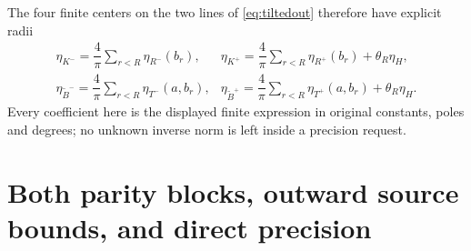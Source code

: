 \documentclass[11pt]{article}
\begin{document}
The four finite centers on the two lines of \eqref{eq:tiltedout}
therefore have explicit radii
\[
 \begin{array}{ll}
 \eta_{K^-}=\dfrac4\pi\sum_{r<R}\eta_{R^-}(b_r),&
 \eta_{K^+}=\dfrac4\pi\sum_{r<R}\eta_{R^+}(b_r)+\theta_R\eta_H,\\[3pt]
 \eta_{\widetilde B^-}=\dfrac4\pi\sum_{r<R}\eta_{T^-}(a,b_r),&
 \eta_{\widetilde B^+}=\dfrac4\pi\sum_{r<R}\eta_{T^+}(a,b_r)
                                      +\theta_R\eta_H.
 \end{array}
\]
Every coefficient here is the displayed finite expression in
original constants, poles and degrees; no unknown inverse norm
is left inside a precision request.

\section{Both parity blocks, outward source bounds, and direct precision}
\end{document}
